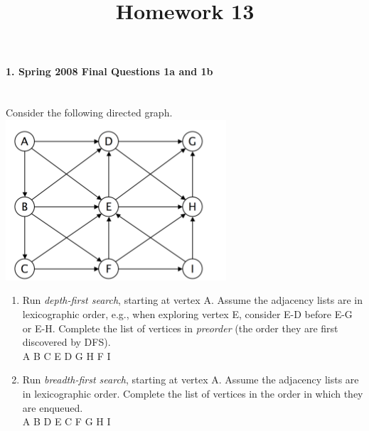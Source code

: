 \documentclass{article}
\begin{document}
\title{Homework 13}
\date{}
\maketitle


\paragraph{\Large 1. Spring 2008 Final Questions 1a and 1b}\mbox{}\\
Consider the following directed graph.\\
\includegraphics[]{fin-s08-1.png}\\
\begin{enumerate}
\renewcommand{\theenumi}{\Alph{enumi}}
	\item Run \textit{depth-first search}, starting at vertex A. Assume the adjacency lists are in lexicographic order, e.g., when exploring vertex E, consider E-D before E-G or E-H. Complete the list of vertices in \textit{preorder} (the order they are first discovered by DFS).\\

	A B C E D G H F I

	\item Run \textit{breadth-first search}, starting at vertex A. Assume the adjacency lists are in lexicographic order. Complete the list of vertices in the order in which they are enqueued.\\

	A B D E C F G H I

\end{enumerate}
\end{document}
